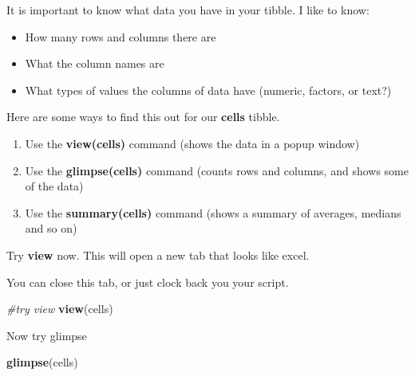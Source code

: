 \documentclass[
]{article}
\newenvironment{Shaded}{\begin{snugshade}}{\end{snugshade}}
\newcommand{\CommentTok}[1]{\textcolor[rgb]{0.56,0.35,0.01}{\textit{#1}}}
\newcommand{\FunctionTok}[1]{\textcolor[rgb]{0.13,0.29,0.53}{\textbf{#1}}}
\newcommand{\NormalTok}[1]{#1}
\providecommand{\tightlist}{%
  \setlength{\itemsep}{0pt}\setlength{\parskip}{0pt}}
\begin{document}
It is important to know what data you have in your tibble. I like to
know:

\begin{itemize}
\tightlist
\item
  How many rows and columns there are
\item
  What the column names are
\item
  What types of values the columns of data have (numeric, factors, or
  text?)
\end{itemize}

Here are some ways to find this out for our \textbf{cells} tibble.

\begin{enumerate}
\def\labelenumi{\arabic{enumi}.}
\tightlist
\item
  Use the \textbf{view(cells)} command (shows the data in a popup
  window)
\item
  Use the \textbf{glimpse(cells)} command (counts rows and columns, and
  shows some of the data)
\item
  Use the \textbf{summary(cells)} command (shows a summary of averages,
  medians and so on)
\end{enumerate}

Try \textbf{view} now. This will open a new tab that looks like excel.

You can close this tab, or just clock back you your script.

\begin{Shaded}
\begin{Highlighting}[]
\CommentTok{\#try view}
\FunctionTok{view}\NormalTok{(cells)}
\end{Highlighting}
\end{Shaded}

Now try glimpse

\begin{Shaded}
\begin{Highlighting}[]
\FunctionTok{glimpse}\NormalTok{(cells)}
\end{Highlighting}
\end{Shaded}
\end{document}

